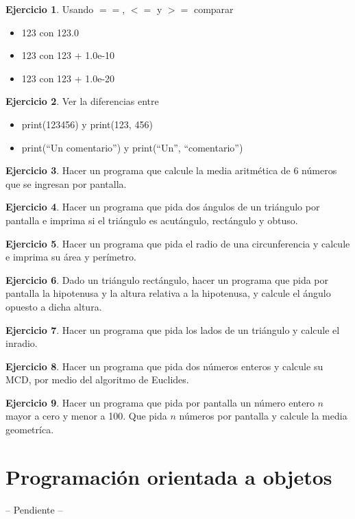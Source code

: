 \documentclass[12pt]{article}
\theoremstyle{definition}
\newtheorem{exercise}{Ejercicio}[section]
\begin{document}
    \begin{exercise}
        Usando $==$, $<=$ y $>=$ comparar
        \begin{itemize}
            \item 123 con 123.0
            \item 123 con 123 + 1.0e-10
            \item 123 con 123 + 1.0e-20
        \end{itemize}
    \end{exercise}

    \begin{exercise}
        Ver la diferencias entre
        \begin{itemize}
            \item print(123456) y print(123, 456)
            \item print(``Un comentario'') y print(``Un'', ``comentario'')
        \end{itemize}
    \end{exercise}

    \begin{exercise}
        Hacer un programa que calcule la media aritmética de 6 números que se ingresan por pantalla.
    \end{exercise}

    \begin{exercise}
        Hacer un programa que pida dos ángulos de un triángulo por pantalla e imprima si el triángulo es acutángulo, rectángulo y obtuso.
    \end{exercise}

    \begin{exercise}
        Hacer un programa que pida el radio de una circunferencia y calcule e imprima su área y perímetro.
    \end{exercise}

    \begin{exercise}
        Dado un triángulo rectángulo, hacer un programa que pida por pantalla la hipotenusa y la altura relativa a la
        hipotenusa, y calcule el ángulo opuesto a dicha altura.
    \end{exercise}

    \begin{exercise}
        Hacer un programa que pida los lados de un triángulo y calcule el inradio.
    \end{exercise}

    \begin{exercise}
        Hacer un programa que pida dos números enteros y calcule su MCD, por medio del algoritmo de Euclides.
    \end{exercise}

    \begin{exercise}
        Hacer un programa que pida por pantalla un número entero $n$ mayor a cero y menor a 100.
        Que pida $n$ números por pantalla y calcule la media geometríca.
    \end{exercise}


    \newpage
    \section{Programación orientada a objetos}
    -- Pendiente --
\end{document}
